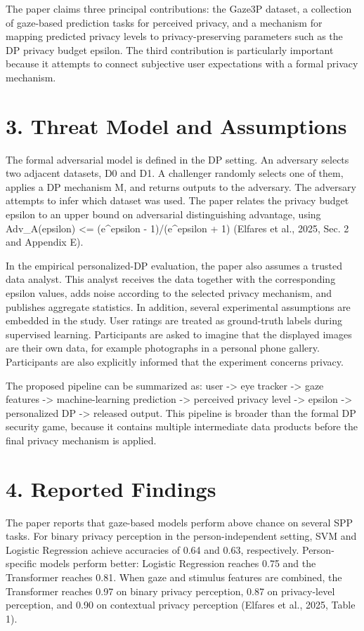 \documentclass[11pt,a4paper]{article}
\begin{document}
The paper claims three principal contributions: the Gaze3P dataset, a collection of gaze-based prediction tasks for perceived privacy, and a mechanism for mapping predicted privacy levels to privacy-preserving parameters such as the DP privacy budget epsilon. The third contribution is particularly important because it attempts to connect subjective user expectations with a formal privacy mechanism.


\section*{3. Threat Model and Assumptions}

The formal adversarial model is defined in the DP setting. An adversary selects two adjacent datasets, D0 and D1. A challenger randomly selects one of them, applies a DP mechanism M, and returns outputs to the adversary. The adversary attempts to infer which dataset was used. The paper relates the privacy budget epsilon to an upper bound on adversarial distinguishing advantage, using Adv\_A(epsilon) <= (e\textasciicircum{}epsilon - 1)/(e\textasciicircum{}epsilon + 1) (Elfares et al., 2025, Sec. 2 and Appendix E).


In the empirical personalized-DP evaluation, the paper also assumes a trusted data analyst. This analyst receives the data together with the corresponding epsilon values, adds noise according to the selected privacy mechanism, and publishes aggregate statistics. In addition, several experimental assumptions are embedded in the study. User ratings are treated as ground-truth labels during supervised learning. Participants are asked to imagine that the displayed images are their own data, for example photographs in a personal phone gallery. Participants are also explicitly informed that the experiment concerns privacy.


The proposed pipeline can be summarized as: user -> eye tracker -> gaze features -> machine-learning prediction -> perceived privacy level -> epsilon -> personalized DP -> released output. This pipeline is broader than the formal DP security game, because it contains multiple intermediate data products before the final privacy mechanism is applied.


\section*{4. Reported Findings}

The paper reports that gaze-based models perform above chance on several SPP tasks. For binary privacy perception in the person-independent setting, SVM and Logistic Regression achieve accuracies of 0.64 and 0.63, respectively. Person-specific models perform better: Logistic Regression reaches 0.75 and the Transformer reaches 0.81. When gaze and stimulus features are combined, the Transformer reaches 0.97 on binary privacy perception, 0.87 on privacy-level perception, and 0.90 on contextual privacy perception (Elfares et al., 2025, Table 1).
\end{document}
